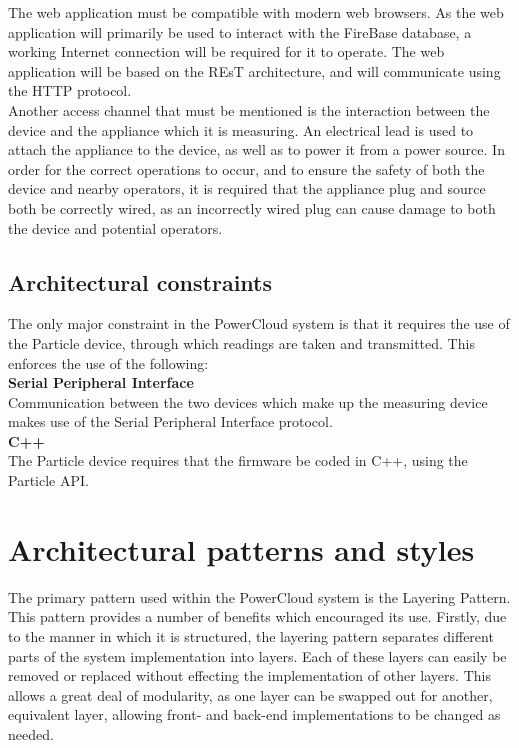 \documentclass{article}
\begin{document}
	The web application must be compatible with modern web browsers. As 
	the web application will primarily be used to interact with the 
	FireBase database, a working Internet connection will be required for 
	it to operate. The web application will be based on the REsT 
	architecture, and will communicate using the HTTP protocol.\\
	
	Another access channel that must be mentioned is the interaction 
	between the device and the appliance which it is measuring. An 
	electrical lead is used to attach the appliance to the device, as 
	well as to power it from a power source. In order for the correct 
	operations to occur, and to ensure the safety of both the device and 
	nearby operators, it is required that the appliance plug and source 
	both be correctly wired, as an incorrectly wired plug can cause 
	damage to both the device and potential operators.
	
	\subsection{Architectural constraints}
	
	The only major constraint in the PowerCloud system is that it 
	requires the use of the Particle device, through which readings are 
	taken and transmitted. This enforces the use of the following:\\
	
	\noindent\textbf{Serial Peripheral Interface}\\
	Communication between the two devices which make up the measuring 
	device makes use of the Serial Peripheral Interface protocol.\\
	
	\noindent\textbf{C++}\\
	The Particle device requires that the firmware be coded in C++, using 
	the Particle API.\\

\newpage

\section{Architectural patterns and styles}

The primary pattern used within the PowerCloud system is the Layering 
Pattern. This pattern provides a number of benefits which encouraged its 
use. Firstly, due to the manner in which it is structured, the layering 
pattern separates different parts of the system implementation into 
layers. Each of these layers can easily be removed or replaced without 
effecting the implementation of other layers. This allows a great deal of 
modularity, as one layer can be swapped out for another, equivalent 
layer, allowing front- and back-end implementations to be changed as 
needed.\\
\end{document}
